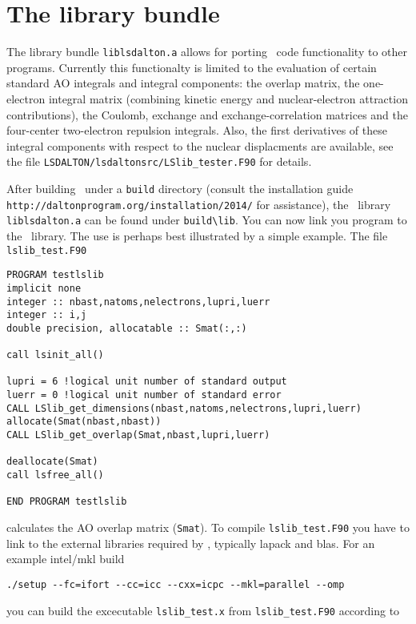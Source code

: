 \section{The {\lsdalton} library bundle}
\label{sec:LSlib}

The {\lsdalton} library bundle \verb|liblsdalton.a| allows for porting \lsdalton\ code 
functionality to other programs. Currently this functionalty is limited to 
the evaluation of certain standard AO integrals and integral components: the overlap 
matrix, the one-electron integral matrix (combining kinetic energy and 
nuclear-electron attraction contributions), the Coulomb, exchange and exchange-correlation 
matrices and the four-center two-electron repulsion integrals. Also, the 
first derivatives of these integral components with respect to the nuclear displacments 
are available, see the file \verb|LSDALTON/lsdaltonsrc/LSlib_tester.F90|
for details. 

After building \lsdalton\ under a \verb|build| directory (consult the installation guide
\verb|http://daltonprogram.org/installation/2014/| for assistance), the \lsdalton\ library 
\verb|liblsdalton.a| can be found under \verb|build\lib|. You can now link you 
program to the \lsdalton\ library. 
The use is perhaps best illustrated by a simple example. The file \verb|lslib_test.F90|

\begin{verbatim}
PROGRAM testlslib
implicit none
integer :: nbast,natoms,nelectrons,lupri,luerr
integer :: i,j
double precision, allocatable :: Smat(:,:)

call lsinit_all()

lupri = 6 !logical unit number of standard output
luerr = 0 !logical unit number of standard error
CALL LSlib_get_dimensions(nbast,natoms,nelectrons,lupri,luerr)
allocate(Smat(nbast,nbast))
CALL LSlib_get_overlap(Smat,nbast,lupri,luerr)

deallocate(Smat)
call lsfree_all()

END PROGRAM testlslib
\end{verbatim}
%
calculates the AO overlap matrix (\verb|Smat|). To compile \verb|lslib_test.F90|
you have to link to the external libraries required by \lsdalton, typically lapack
and blas. For an example intel/mkl build

\begin{verbatim}
./setup --fc=ifort --cc=icc --cxx=icpc --mkl=parallel --omp
\end{verbatim}
%
you can build the excecutable \verb|lslib_test.x| from \verb|lslib_test.F90| according to

